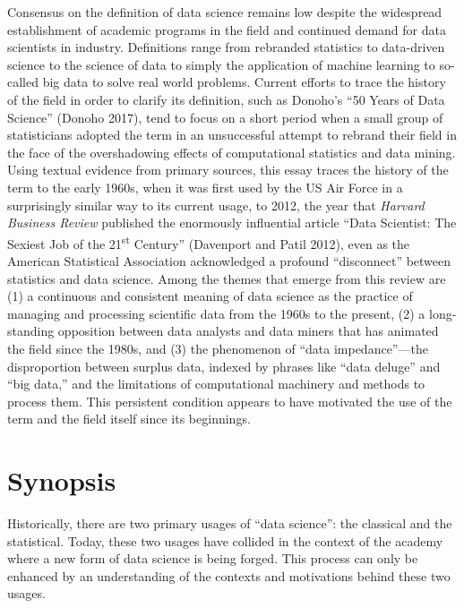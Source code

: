 \documentclass[
  letterpaper,
]{report}
\begin{document}
Consensus on the definition of data science remains low despite the
widespread establishment of academic programs in the field and continued
demand for data scientists in industry. Definitions range from rebranded
statistics to data-driven science to the science of data to simply the
application of machine learning to so-called big data to solve real
world problems. Current efforts to trace the history of the field in
order to clarify its definition, such as Donoho's ``50 Years of Data
Science'' (Donoho 2017), tend to focus on a short period when a small
group of statisticians adopted the term in an unsuccessful attempt to
rebrand their field in the face of the overshadowing effects of
computational statistics and data mining. Using textual evidence from
primary sources, this essay traces the history of the term to the early
1960s, when it was first used by the US Air Force in a surprisingly
similar way to its current usage, to 2012, the year that \emph{Harvard
Business Review} published the enormously influential article ``Data
Scientist: The Sexiest Job of the 21\textsuperscript{st} Century''
(Davenport and Patil 2012), even as the American Statistical Association
acknowledged a profound ``disconnect'' between statistics and data
science. Among the themes that emerge from this review are (1) a
continuous and consistent meaning of data science as the practice of
managing and processing scientific data from the 1960s to the present,
(2) a long-standing opposition between data analysts and data miners
that has animated the field since the 1980s, and (3) the phenomenon of
``data impedance''---the disproportion between surplus data, indexed by
phrases like ``data deluge'' and ``big data,'' and the limitations of
computational machinery and methods to process them. This persistent
condition appears to have motivated the use of the term and the field
itself since its beginnings.

\hypertarget{synopsis}{%
\chapter{Synopsis}\label{synopsis}}

Historically, there are two primary usages of ``data science'': the
classical and the statistical. Today, these two usages have collided in
the context of the academy where a new form of data science is being
forged. This process can only be enhanced by an understanding of the
contexts and motivations behind these two usages.
\end{document}
